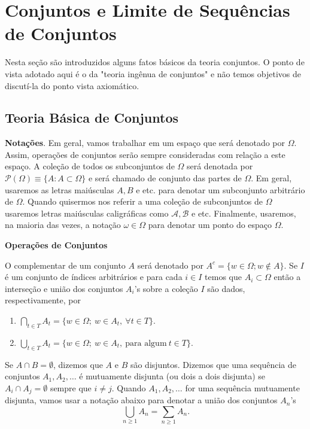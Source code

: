 \chapter[Aula 1]{Conjuntos e Limite de Sequências de Conjuntos}
\chaptermark{}

Nesta seção são introduzidos alguns fatos básicos da teoria
conjuntos. O ponto de vista adotado aqui é o da "teoria ingênua
de conjuntos" e não temos objetivos de discutí-la do ponto 
vista axiomático.

  
\section{Teoria Básica de Conjuntos}
\textbf{Notações}.
%
Em geral, vamos trabalhar em um espaço que será denotado 
por $\Omega$. Assim, operações de conjuntos serão sempre 
consideradas com relação a este espaço. 
A coleção de todos os subconjuntos de $\Omega$ será 
denotada por $\mathcal{P}(\Omega)\equiv \{A: A\subset \Omega\}$ e 
será chamado de conjunto das partes de $\Omega$.
Em geral, usaremos as letras maiúsculas $A,B$ e etc. para denotar
um subconjunto arbitrário de $\Omega$. Quando quisermos nos referir
a uma coleção de subconjuntos de $\Omega$ usaremos letras maiúsculas 
caligráficas como $\mathcal{A}, \mathcal{B}$ e etc. Finalmente,
usaremos, na maioria das vezes, a notação $\omega\in\Omega$ 
para denotar um ponto do espaço $\Omega$.


\noindent
\textbf{Operações de Conjuntos}

O complementar de um conjunto $A$ será 
denotado por $A^{c}= \{w \in \Omega; w \notin A\}$. 
Se $I$ é um conjunto de índices arbitrários e 
para cada $i\in I$ temos que $A_i\subset \Omega$ então 
a interseção e união dos conjuntos $A_i$'s sobre a coleção
$I$ são dados, respectivamente, por 
\begin{enumerate}
	\item[]  $\displaystyle\bigcap_{t \in T}{A_t}
							= 
						\{ w \in \Omega;\ w \in A_t,\ \forall t \in T\}$.
	\item[]  $\displaystyle\bigcup_{t \in T}{A_t}
							= 
						\{ w \in \Omega;\ w \in A_t,\ \text{para algum}\ t \in T \}$.
\end{enumerate}
%
%
%
Se $A \cap B = \emptyset$, dizemos que $A$ e $B$ são disjuntos.
Dizemos que uma sequência de conjuntos 
$A_1, A_2,\ldots$ é mutuamente disjunta (ou dois a dois disjunta) 
se $A_i \cap A_j = \emptyset$ sempre que $i \neq j$. 
Quando $A_1,A_2,\ldots $ for uma sequência mutuamente disjunta, 
vamos usar a notação abaixo para denotar a união dos conjuntos $A_n$'s
$$
	\displaystyle\bigcup_{n \geqslant 1}{A_n} = \sum_{n \geqslant 1} A_n.	
$$

